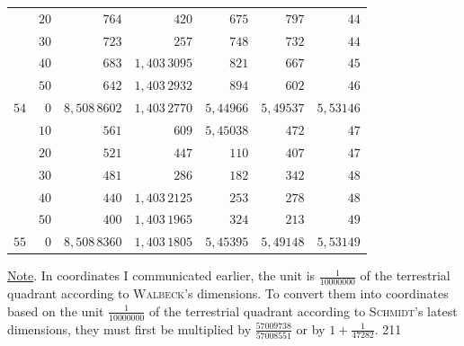 \begin{center}
\begin{tabular}{|r@{\;}r|r|r|r|r|r|}
&$20$&$764$&$420$&$675$&$797$&$44$\\
&$30$&$723$&$257$&$748$&$732$&$44$\\
&$40$&$683$&$1{,}403\,3095$&$821$&$667$&$45$\\
&$50$&$642$&$1{,}403\,2932$&$894$&$602$&$46$\\\hline
$54$&$0$&$8{,}508\,8602$&$1{,}403\,2770$&$5{,}44966$&$5{,}49537$&$5{,}53146$\\
&$10$&$561$&$609$&$5{,}45038$&$472$&$47$\\
&$20$&$521$&$447$&$110$&$407$&$47$\\
&$30$&$481$&$286$&$182$&$342$&$48$\\
&$40$&$440$&$1{,}403\,2125$&$253$&$278$&$48$\\
&$50$&$400$&$1{,}403\,1965$&$324$&$213$&$49$\\\hline
$55$&$0$&$8{,}508\,8360$&$1{,}403\,1805$&$5{,}45395$&$5{,}49148$&$5{,}53149$\\
\end{tabular}\par\endgroup
\end{center}
\underline{Note}. In coordinates I communicated earlier, the unit is $\frac1{10000000}$ of the terrestrial quadrant according to \textsc{Walbeck}'s dimensions. To convert them into coordinates based on the unit $\frac1{10000000}$ of the terrestrial quadrant according to \textsc{Schmidt}'s latest dimensions, they must first be multiplied by $\frac{57009738}{57008551}$ or by $1+\frac1{47282}$.
\clearpage
{}\hfill211\par\medskip

